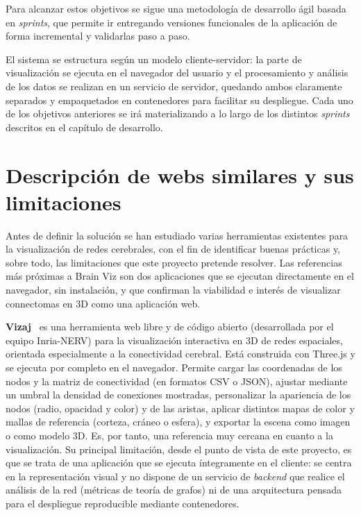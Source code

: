 Para alcanzar estos objetivos se sigue una metodología de desarrollo ágil basada en
\textit{sprints}, que permite ir entregando versiones funcionales de la aplicación de forma
incremental y validarlas paso a paso.

El sistema se estructura según un modelo cliente-servidor: la parte de visualización se ejecuta en el
navegador del usuario y el procesamiento y análisis de los datos se realizan en un servicio de
servidor, quedando ambos claramente separados y empaquetados en contenedores para facilitar su
despliegue. Cada uno de los objetivos anteriores se irá materializando a lo largo de los distintos
\textit{sprints} descritos en el capítulo de desarrollo.

\section{Descripción de webs similares y sus limitaciones}

Antes de definir la solución se han estudiado varias herramientas existentes para la visualización
de redes cerebrales, con el fin de identificar buenas prácticas y, sobre todo, las limitaciones que
este proyecto pretende resolver. Las referencias más próximas a Brain Viz son dos aplicaciones que
se ejecutan directamente en el navegador, sin instalación, y que confirman la viabilidad e interés
de visualizar connectomas en 3D como una aplicación web.

\textbf{Vizaj}~\cite{vizaj} es una herramienta web libre y de código abierto (desarrollada por el
equipo Inria-NERV) para la visualización interactiva en 3D de redes espaciales, orientada
especialmente a la conectividad cerebral. Está construida con Three.js y se ejecuta por completo en
el navegador. Permite cargar las coordenadas de los nodos y la matriz de conectividad (en formatos
CSV o JSON), ajustar mediante un umbral la densidad de conexiones mostradas, personalizar la
apariencia de los nodos (radio, opacidad y color) y de las aristas, aplicar distintos mapas de color
y mallas de referencia (corteza, cráneo o esfera), y exportar la escena como imagen o como modelo
3D. Es, por tanto, una referencia muy cercana en cuanto a la visualización. Su principal limitación,
desde el punto de vista de este proyecto, es que se trata de una aplicación que se ejecuta
íntegramente en el cliente: se centra en la representación visual y no dispone de un servicio de
\textit{backend} que realice el análisis de la red (métricas de teoría de grafos) ni de una
arquitectura pensada para el despliegue reproducible mediante contenedores.

